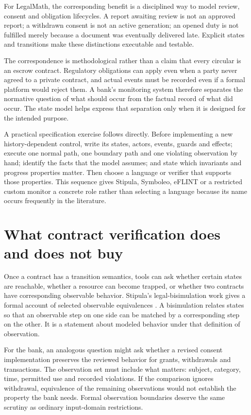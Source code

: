 \documentclass[12pt,a4paper,oneside,openany]{book}
\begin{document}
For LegalMath, the corresponding benefit is a disciplined way to model review,
consent and obligation lifecycles. A report awaiting review is not an approved
report; a withdrawn consent is not an active generation; an opened duty is not
fulfilled merely because a document was eventually delivered late. Explicit
states and transitions make these distinctions executable and testable.

The correspondence is methodological rather than a claim that every circular is
an escrow contract. Regulatory obligations can apply even when a party never
agreed to a private contract, and actual events must be recorded even if a formal
platform would reject them. A bank's monitoring system therefore separates the
normative question of what should occur from the factual record of what did
occur. The state model helps express that separation only when it is designed
for the intended purpose.

A practical specification exercise follows directly. Before implementing a new
history-dependent control, write its states, actors, events, guards and effects;
execute one normal path, one boundary path and one violating observation by hand;
identify the facts that the model assumes; and state which invariants and progress
properties matter. Then choose a language or verifier that supports those
properties. This sequence gives Stipula, Symboleo, eFLINT or a restricted custom
monitor a concrete role rather than selecting a language because its name occurs
frequently in the literature.

\section{What contract verification does and does not buy}
\label{merge:M04:07}

\label{sec:languages-contractverification}
Once a contract has a transition semantics, tools can ask whether certain
states are reachable, whether a resource can become trapped, or whether two
contracts have corresponding observable behavior. Stipula's legal-bisimulation
work gives a formal account of selected observable equivalences
\citep[behavioral equivalence section]{stipula2021}. A bisimulation relates
states so that an observable step on one side can be matched by a corresponding
step on the other. It is a statement about modeled behavior under that
definition of observation.

For the bank, an analogous question might ask whether a revised consent
implementation preserves the reviewed behavior for grants, withdrawals and
transactions. The observation set must include what matters: subject, category,
time, permitted use and recorded violations. If the comparison ignores
withdrawal, equivalence of the remaining observations would not establish the
property the bank needs. Formal observation boundaries deserve the same
scrutiny as ordinary input-domain restrictions.
\end{document}
